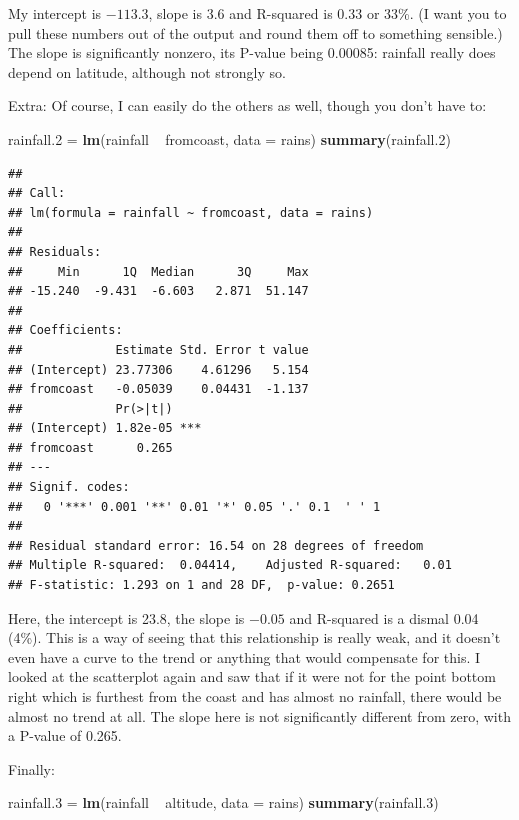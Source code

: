 \documentclass[]{tufte-book}
\newenvironment{Shaded}{}{}
\newcommand{\DataTypeTok}[1]{\textcolor[rgb]{0.56,0.13,0.00}{#1}}
\newcommand{\FloatTok}[1]{\textcolor[rgb]{0.25,0.63,0.44}{#1}}
\newcommand{\KeywordTok}[1]{\textcolor[rgb]{0.00,0.44,0.13}{\textbf{#1}}}
\newcommand{\NormalTok}[1]{#1}
\newcommand{\OperatorTok}[1]{\textcolor[rgb]{0.40,0.40,0.40}{#1}}
\newcommand{\StringTok}[1]{\textcolor[rgb]{0.25,0.44,0.63}{#1}}
\theoremstyle{definition}
\theoremstyle{definition}
\theoremstyle{definition}
\theoremstyle{remark}
\begin{document}
My intercept is \(-113.3\), slope is \(3.6\) and R-squared is \(0.33\)
or 33\%. (I want you to pull these numbers out of the output and round
them off to something sensible.) The slope is significantly nonzero, its
P-value being 0.00085: rainfall really does depend on latitude, although
not strongly so.

Extra: Of course, I can easily do the others as well, though you don't
have to:

\begin{Shaded}
\begin{Highlighting}[]
\NormalTok{rainfall}\FloatTok{.2}\NormalTok{ =}\StringTok{ }\KeywordTok{lm}\NormalTok{(rainfall }\OperatorTok{~}\StringTok{ }\NormalTok{fromcoast, }\DataTypeTok{data =}\NormalTok{ rains)}
\KeywordTok{summary}\NormalTok{(rainfall}\FloatTok{.2}\NormalTok{)}
\end{Highlighting}
\end{Shaded}

\begin{verbatim}
## 
## Call:
## lm(formula = rainfall ~ fromcoast, data = rains)
## 
## Residuals:
##     Min      1Q  Median      3Q     Max 
## -15.240  -9.431  -6.603   2.871  51.147 
## 
## Coefficients:
##             Estimate Std. Error t value
## (Intercept) 23.77306    4.61296   5.154
## fromcoast   -0.05039    0.04431  -1.137
##             Pr(>|t|)    
## (Intercept) 1.82e-05 ***
## fromcoast      0.265    
## ---
## Signif. codes:  
##   0 '***' 0.001 '**' 0.01 '*' 0.05 '.' 0.1  ' ' 1
## 
## Residual standard error: 16.54 on 28 degrees of freedom
## Multiple R-squared:  0.04414,    Adjusted R-squared:   0.01 
## F-statistic: 1.293 on 1 and 28 DF,  p-value: 0.2651
\end{verbatim}

Here, the intercept is 23.8, the slope is \(-0.05\) and R-squared is a
dismal 0.04 (4\%). This is a way of seeing that this relationship is
really weak, and it doesn't even have a curve to the trend or anything
that would compensate for this. I looked at the scatterplot again and
saw that if it were not for the point bottom right which is furthest
from the coast and has almost no rainfall, there would be almost no
trend at all. The slope here is not significantly different from zero,
with a P-value of 0.265.

Finally:

\begin{Shaded}
\begin{Highlighting}[]
\NormalTok{rainfall}\FloatTok{.3}\NormalTok{ =}\StringTok{ }\KeywordTok{lm}\NormalTok{(rainfall }\OperatorTok{~}\StringTok{ }\NormalTok{altitude, }\DataTypeTok{data =}\NormalTok{ rains)}
\KeywordTok{summary}\NormalTok{(rainfall}\FloatTok{.3}\NormalTok{)}
\end{Highlighting}
\end{Shaded}
\end{document}

